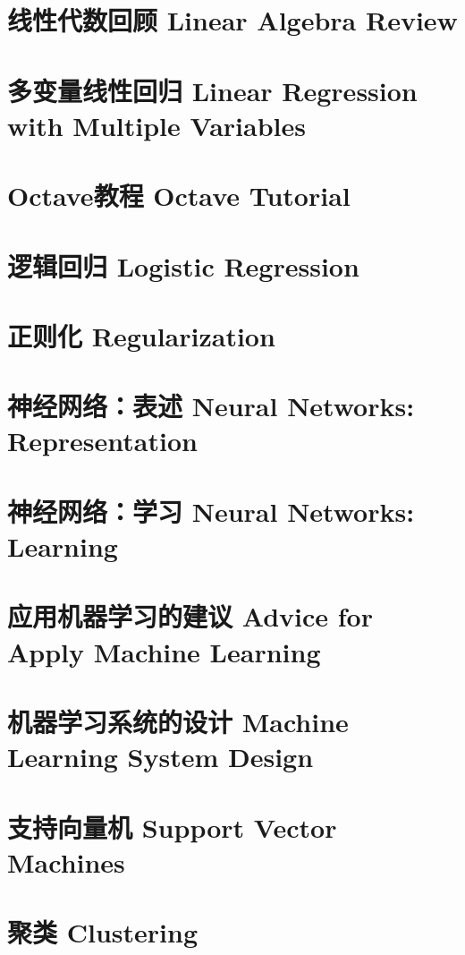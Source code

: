 \documentclass[12pt, a4paper]{article}
\begin{document}
    \section{线性代数回顾 Linear Algebra Review}

    \section{多变量线性回归 Linear Regression with Multiple Variables}

    \section{Octave教程 Octave Tutorial}

    \section{逻辑回归 Logistic Regression}

    \section{正则化 Regularization}

    \section{神经网络：表述 Neural Networks: Representation}

    \section{神经网络：学习 Neural Networks: Learning}
    
    \section{应用机器学习的建议 Advice for Apply Machine Learning}

    \section{机器学习系统的设计 Machine Learning System Design}

    \section{支持向量机 Support Vector Machines}

    \section{聚类 Clustering}
\end{document}
